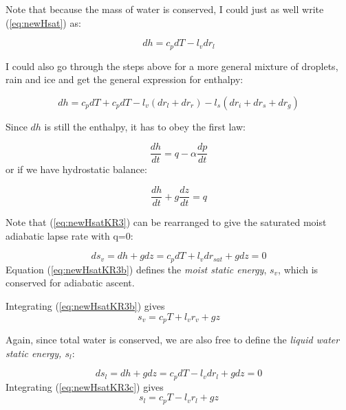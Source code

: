 \documentclass[12pt]{article}
\begin{document}
Note that because the mass of water is conserved, I could just as well write (\ref{eq:newHsat}) as:

\begin{equation}
  \label{eq:newHsatb}
  dh = c_p dT  - l_v dr_l
\end{equation}


I could also go through the steps above for a more general  mixture of droplets, rain and ice
and get the general  expression for enthalpy:


\begin{equation}
  \label{eq:newHsatKR}
  dh = c_p dT + 
        c_p dT - l_v (dr_l + dr_r) - l_s (dr_i + dr_s + dr_g)
\end{equation}

Since $dh$ is still the enthalpy, it has to obey the first law:

\begin{equation}
  \label{eq:newHsatKR2}
  \frac{dh}{dt} = q - \alpha \frac{dp}{dt} 
\end{equation}
or if we have hydrostatic balance:

\begin{equation}
  \label{eq:newHsatKR3}
  \frac{dh}{dt} + g\frac{dz}{dt}  = q
\end{equation}

Note that (\ref{eq:newHsatKR3}) can be rearranged to give the saturated moist adiabatic lapse rate
with q=0:

\begin{equation}
  \label{eq:newHsatKR3b}
ds_v =  dh + g dz   = c_p dT + l_v d r_{sat} + g dz = 0
\end{equation}
Equation (\ref{eq:newHsatKR3b}) defines the \textit{moist static energy}, $s_v$,
which is conserved for adiabatic ascent.

Integrating (\ref{eq:newHsatKR3b}) gives
\begin{equation}
  \label{eq:newHsatKR3e}
s_v = c_p T + l_v r_v + g z
\end{equation}


Again, since total water is conserved,
we are also free to define the \textit{liquid water static energy, $s_l$}:

\begin{equation}
  \label{eq:newHsatKR3c}
ds_l =  dh + g dz   = c_p dT - l_v d r_l + g dz = 0
\end{equation}
Integrating (\ref{eq:newHsatKR3c}) gives
\begin{equation}
  \label{eq:newHsatKR3d}
s_l = c_p T - l_v r_l + g z
\end{equation}
\end{document}
